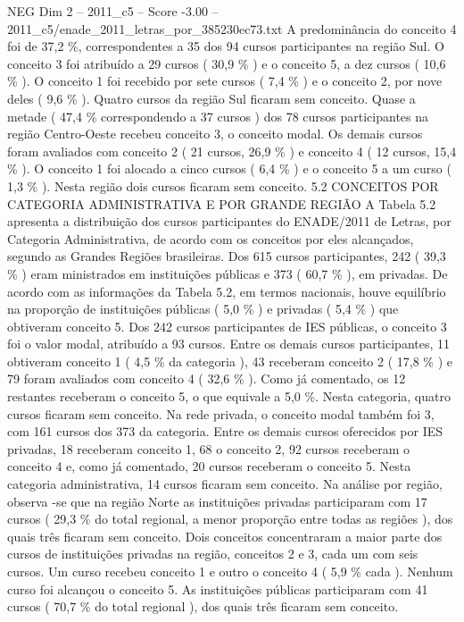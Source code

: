 \begin{textsample}{NEG Dim 2 – 2011\_c5 – Score -3.00 – 2011\_c5/enade\_2011\_letras\_por\_385230ec73.txt}
A predominância do conceito 4 foi de 37,2 \%, correspondentes a 35 dos 94 cursos participantes na região Sul.
O conceito 3 foi atribuído a 29 cursos ( 30,9 \% ) e o conceito 5, a dez cursos ( 10,6 \% ).
O conceito 1 foi recebido por sete cursos ( 7,4 \% ) e o conceito 2, por nove deles ( 9,6 \% ).
Quatro cursos da região Sul ficaram sem conceito.
Quase a metade ( 47,4 \% correspondendo a 37 cursos ) dos 78 cursos participantes na região Centro-Oeste recebeu conceito 3, o conceito modal.
Os demais cursos foram avaliados com conceito 2 ( 21 cursos, 26,9 \% ) e conceito 4 ( 12 cursos, 15,4 \% ).
O conceito 1 foi alocado a cinco cursos ( 6,4 \% ) e o conceito 5 a um curso ( 1,3 \% ).
Nesta região dois cursos ficaram sem conceito. 5.2 CONCEITOS POR CATEGORIA ADMINISTRATIVA E POR GRANDE REGIÃO A Tabela 5.2 apresenta a distribuição dos cursos participantes do ENADE/2011 de Letras, por Categoria Administrativa, de acordo com os conceitos por eles alcançados, segundo as Grandes Regiões brasileiras.
Dos 615 cursos participantes, 242 ( 39,3 \% ) eram ministrados em instituições públicas e 373 ( 60,7 \% ), em privadas.
De acordo com as informações da Tabela 5.2, em termos nacionais, houve equilíbrio na proporção de instituições públicas ( 5,0 \% ) e privadas ( 5,4 \% ) que obtiveram conceito 5.
Dos 242 cursos participantes de IES públicas, o conceito 3 foi o valor modal, atribuído a 93 cursos.
Entre os demais cursos participantes, 11 obtiveram conceito 1 ( 4,5 \% da categoria ), 43 receberam conceito 2 ( 17,8 \% ) e 79 foram avaliados com conceito 4 ( 32,6 \% ).
Como já comentado, os 12 restantes receberam o conceito 5, o que equivale a 5,0 \%.
Nesta categoria, quatro cursos ficaram sem conceito.
Na rede privada, o conceito modal também foi 3, com 161 cursos dos 373 da categoria.
Entre os demais cursos oferecidos por IES privadas, 18 receberam conceito 1, 68 o conceito 2, 92 cursos receberam o conceito 4 e, como já comentado, 20 cursos receberam o conceito 5.
Nesta categoria administrativa, 14 cursos ficaram sem conceito.
Na análise por região, observa -se que na região Norte as instituições privadas participaram com 17 cursos ( 29,3 \% do total regional, a menor proporção entre todas as regiões ), dos quais três ficaram sem conceito.
Dois conceitos concentraram a maior parte dos cursos de instituições privadas na região, conceitos 2 e 3, cada um com seis cursos.
Um curso recebeu conceito 1 e outro o conceito 4 ( 5,9 \% cada ).
Nenhum curso foi alcançou o conceito 5.
As instituições públicas participaram com 41 cursos ( 70,7 \% do total regional ), dos quais três ficaram sem conceito.

\end{textsample}
